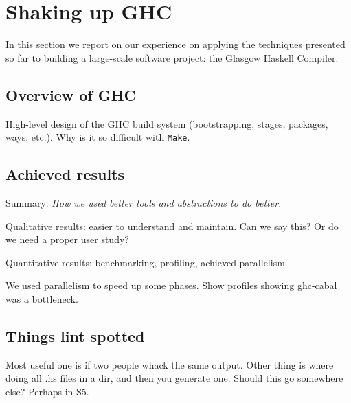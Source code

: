 \section{Shaking up GHC\label{sec:ghc}}

In this section we report on our experience on applying the techniques presented
so far to building a large-scale software project: the Glasgow Haskell Compiler.

\subsection{Overview of GHC}

High-level design of the GHC build system (bootstrapping, stages,
packages, ways, etc.). Why is it so difficult with \texttt{Make}.

\subsection{Achieved results}

Summary: \emph{How we used better tools and abstractions to do better.}

Qualitative results: easier to understand and maintain. Can we say this? Or do
we need a proper user study?

Quantitative results: benchmarking, profiling, achieved parallelism.

We used parallelism to speed up some phases. Show profiles showing ghc-cabal was a bottleneck.

\subsection{Things lint spotted}

Most useful one is if two people whack the same output. Other thing is where doing all .hs files in a dir, and then you generate one. Should this go somewhere else? Perhaps in S5.

